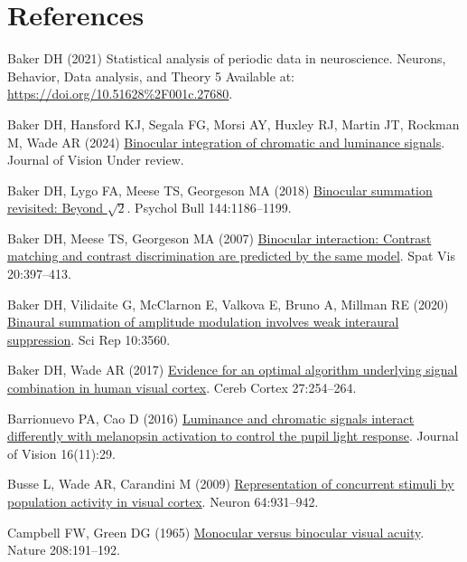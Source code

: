 \documentclass[
]{article}
\newlength{\cslhangindent}
\newenvironment{CSLReferences}[2] %
 {\begin{list}{}{%
  \setlength{\itemindent}{0pt}
  \setlength{\leftmargin}{0pt}
  \setlength{\parsep}{0pt}
  \ifodd #1
   \setlength{\leftmargin}{\cslhangindent}
   \setlength{\itemindent}{-1\cslhangindent}
  \fi
  \setlength{\itemsep}{#2\baselineskip}}}
 {\end{list}}
\begin{document}
\section{References}\label{references}

\label{refs}
\begin{CSLReferences}{1}{1}
Baker DH (2021) Statistical analysis of periodic data in neuroscience. Neurons, Behavior, Data analysis, and Theory 5 Available at: \url{https://doi.org/10.51628\%2F001c.27680}.

Baker DH, Hansford KJ, Segala FG, Morsi AY, Huxley RJ, Martin JT, Rockman M, Wade AR (2024) \href{https://doi.org/10.31234/osf.io/atsfh}{Binocular integration of chromatic and luminance signals}. Journal of Vision Under review.

Baker DH, Lygo FA, Meese TS, Georgeson MA (2018) \href{https://doi.org/10.1037/bul0000163}{Binocular summation revisited: Beyond \(\sqrt{2}\)}. Psychol Bull 144:1186--1199.

Baker DH, Meese TS, Georgeson MA (2007) \href{https://doi.org/10.1163/156856807781503622}{Binocular interaction: Contrast matching and contrast discrimination are predicted by the same model}. Spat Vis 20:397--413.

Baker DH, Vilidaite G, McClarnon E, Valkova E, Bruno A, Millman RE (2020) \href{https://doi.org/10.1038/s41598-020-60602-5}{Binaural summation of amplitude modulation involves weak interaural suppression}. Sci Rep 10:3560.

Baker DH, Wade AR (2017) \href{https://doi.org/10.1093/cercor/bhw395}{Evidence for an optimal algorithm underlying signal combination in human visual cortex}. Cereb Cortex 27:254--264.

Barrionuevo PA, Cao D (2016) \href{https://doi.org/10.1167/16.11.29}{Luminance and chromatic signals interact differently with melanopsin activation to control the pupil light response}. Journal of Vision 16(11):29.

Busse L, Wade AR, Carandini M (2009) \href{https://doi.org/10.1016/j.neuron.2009.11.004}{Representation of concurrent stimuli by population activity in visual cortex}. Neuron 64:931--942.

Campbell FW, Green DG (1965) \href{https://doi.org/10.1038/208191a0}{Monocular versus binocular visual acuity}. Nature 208:191--192.


\end{CSLReferences}
\end{document}
